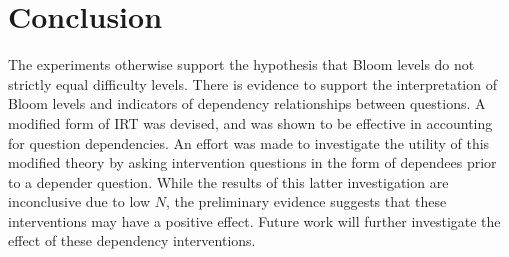 \documentclass[a4paper,twocolumn]{article}
\begin{document}
\section{Conclusion}

The experiments otherwise support the hypothesis that Bloom levels do not
strictly equal difficulty levels.  There is evidence to support the
interpretation of Bloom levels and indicators of dependency relationships
between questions.  A modified form of IRT was devised, and was shown to be
effective in accounting for question dependencies.   An effort was made to
investigate the utility of this modified theory by asking intervention
questions in the form of dependees prior to a depender question.  While the
results of this latter investigation are inconclusive due to low $N$, the
preliminary evidence suggests that these interventions may have a positive
effect.  Future work will further investigate the effect of these dependency
interventions.



\end{document}
